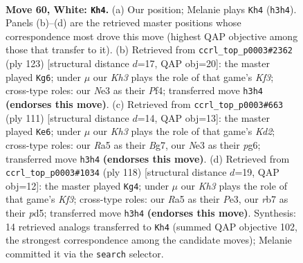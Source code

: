 \documentclass[11pt]{article}
\begin{document}
\clearpage

\begin{figure}[p]\centering
\begin{subfigure}{0.46\textwidth}\centering
\resizebox{\linewidth}{!}{%
\newchessgame
\chessboard[
  setfen={7k/1r4b1/6R1/R7/2P5/4N2K/8/8 w - - 40 60},
  showmover=false,
  pgfstyle=straightmove, color=movearrow, markmove={h3-h4}
]}
\caption{}
\end{subfigure}\hfill
\begin{subfigure}{0.46\textwidth}\centering
\resizebox{\linewidth}{!}{%
\newchessgame
\chessboard[
  setfen={R7/8/5k2/8/5p2/Br6/8/K7 b - - 6 62},
  showmover=false,
  pgfstyle=straightmove, color=movearrow, markmove={f6-g6}
]}
\caption{}
\end{subfigure}
\\[4pt]
\begin{subfigure}{0.46\textwidth}\centering
\resizebox{\linewidth}{!}{%
\newchessgame
\chessboard[
  setfen={8/3k2b1/6P1/7p/8/R3BK2/8/4r3 b - - 0 56},
  showmover=false,
  pgfstyle=straightmove, color=movearrow, markmove={d7-e6}
]}
\caption{}
\end{subfigure}\hfill
\begin{subfigure}{0.46\textwidth}\centering
\resizebox{\linewidth}{!}{%
\newchessgame
\chessboard[
  setfen={8/8/5k2/3pb2R/8/4PK2/8/8 w - - 0 60},
  showmover=false,
  pgfstyle=straightmove, color=movearrow, markmove={f3-g4}
]}
\caption{}
\end{subfigure}
\caption{\textbf{Move 60, White: \texttt{Kh4}.} (a) Our position; Melanie plays \texttt{Kh4} (\texttt{h3h4}). Panels (b)--(d) are the retrieved master positions whose correspondence most drove this move (highest QAP objective among those that transfer to it). (b) Retrieved from \texttt{ccrl\_top\_p0003\#2362} (ply 123) [structural distance $d$=17, QAP obj=20]: the master played \texttt{Kg6}; under $\mu$ our \emph{Kh3} plays the role of that game's \emph{Kf3}; cross-type roles: our \emph{N}e3 as their \emph{P}f4; transferred move \texttt{h3h4} \textbf{(endorses this move)}. (c) Retrieved from \texttt{ccrl\_top\_p0003\#663} (ply 111) [structural distance $d$=14, QAP obj=13]: the master played \texttt{Ke6}; under $\mu$ our \emph{Kh3} plays the role of that game's \emph{Kd2}; cross-type roles: our \emph{R}a5 as their \emph{B}g7, our \emph{N}e3 as their \emph{p}g6; transferred move \texttt{h3h4} \textbf{(endorses this move)}. (d) Retrieved from \texttt{ccrl\_top\_p0003\#1034} (ply 118) [structural distance $d$=19, QAP obj=12]: the master played \texttt{Kg4}; under $\mu$ our \emph{Kh3} plays the role of that game's \emph{Kf3}; cross-type roles: our \emph{R}a5 as their \emph{P}e3, our \emph{r}b7 as their \emph{p}d5; transferred move \texttt{h3h4} \textbf{(endorses this move)}. Synthesis: 14 retrieved analogs transferred to \texttt{Kh4} (summed QAP objective 102, the strongest correspondence among the candidate moves); Melanie committed it via the \texttt{search} selector.}
\label{fig:thought-m118}
\end{figure}
\end{document}
